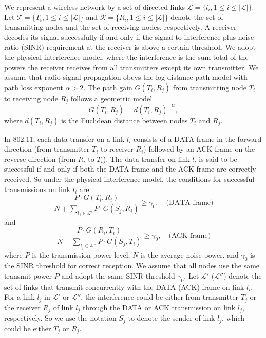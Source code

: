\documentclass[conference]{IEEEtran}
\begin{document}
We represent a wireless network by a set of directed links
$\mathcal{L}=\{l_i, 1\le i \le {\left| \mathcal{L} \right|}\}$. Let
$\mathcal{T}=\{T_i, 1\le i \le {\left| \mathcal{L} \right|}\}$ and
$\mathcal{R}=\{R_i, 1\le i \le {\left| \mathcal{L} \right|}\}$
denote the set of transmitting nodes and the set of receiving nodes,
respectively. A receiver decodes its signal successfully if and only
if the signal-to-interference-plus-noise ratio (SINR) requirement at
the receiver is above a certain threshold. We adopt the physical
interference model, where the interference is the sum total of the
powers the receiver receives from all transmitters except its own
transmitter. We assume that radio signal propagation obeys the
log-distance path model with path loss exponent $\alpha>2$. The path
gain $G(T_i,R_j)$ from transmitting node $T_i$ to receiving node
$R_j$ follows a geometric model
\begin{equation}
G(T_i,R_j)={d(T_i,R_j)}^{-\alpha}, \label{channelm}
\end{equation}
where $d(T_i,R_j)$ is the Euclidean distance between nodes $T_i$ and
$R_j$.


In 802.11, each data transfer on a link $l_i$ consists of a DATA
frame in the forward direction (from transmitter $T_i$ to receiver
$R_i$) followed by an ACK frame on the reverse direction (from $R_i$
to $T_i$). The data transfer on link $l_i$ is said to be successful
if and only if both the DATA frame and the ACK frame are correctly
received. So under the physical interference model, the conditions
for successful transmissions on link $l_i$ are
\begin{equation} \frac{P\cdot
G(T_i ,R_i )}{N + \sum\limits_{l_j \in \mathcal{L}'}{P\cdot G(S_j
,R_i )} } \ge {\gamma}_0, \quad \text{(DATA frame)}\label{SINR1}
\end{equation}
and
\begin{equation} \frac{P\cdot
G(R_i ,T_i )}{N + \sum\limits_{l_j \in \mathcal{L}''}{P\cdot G(S_j
,T_i )} } \ge {\gamma}_0, \quad \text{(ACK frame)}\label{SINR2}
\end{equation}
where $P$ is the transmission power level, $N$ is the average noise
power, and $\gamma_0$ is the SINR threshold for correct reception.
We assume that all nodes use the same transmit power $P$ and adopt
the same SINR threshold $\gamma_0$. Let $\mathcal{L}'$
($\mathcal{L}''$) denote the set of links that transmit concurrently
with the DATA (ACK) frame on link $l_i$. For a link $l_j$ in
$\mathcal{L}'$ or $\mathcal{L}''$, the interference could be either
from transmitter $T_j$ or the receiver $R_j$ of link $l_j$ through
the DATA or ACK transmission on link $l_j$, respectively. So we use
the notation $S_j$ to denote the sender of link $l_j$, which could
be either $T_j$ or $R_j$.
\end{document}
